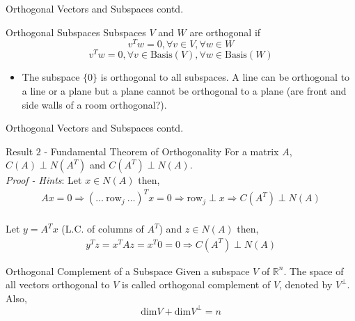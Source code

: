 \documentclass{beamer}
\begin{document}
\begin{frame}{Orthogonal Vectors and Subspaces contd.}
\begin{exampleblock}{Orthogonal Subspaces}
Subspaces $V$ and $W$ are orthogonal if 
\begin{equation*}
v^Tw = 0, \forall v \in V, \forall w \in W
\end{equation*}
\begin{equation*}
v^Tw = 0, \forall v \in \text{Basis}(V), \forall w \in \text{Basis}(W)
\end{equation*}
\end{exampleblock}
\begin{itemize}
    \item The subspace $\{0\}$ is orthogonal to all subspaces. A line can be orthogonal to a line or a plane but a plane cannot be orthogonal to a plane (are front and side walls of a room orthogonal?).
\end{itemize}
\end{frame}

\begin{frame}{Orthogonal Vectors and Subspaces contd.}
\begin{block}{Result $2$ - Fundamental Theorem of Orthogonality}
For a matrix $A$, $C(A) \perp N(A^T)$ and $C(A^T) \perp N(A)$.\\
\textit{Proof - Hints}: Let $x \in N(A)$ then,
\begin{align*}
    Ax = 0 \Rightarrow (\ldots \ \text{row}_j\ \ldots)^Tx = 0 \Rightarrow \text{row}_j \perp x \Rightarrow C(A^T) \perp N(A)
\end{align*}
\\
Let $y = A^Tx$ (L.C. of columns of $A^T$) and $z \in N(A)$ then,
\begin{align*}
    y^Tz = x^TAz = x^T0 = 0 \Rightarrow C(A^T) \perp N(A)
\end{align*}
\end{block}
\begin{exampleblock}{Orthogonal Complement of a Subspace}
Given a subspace $V$ of $\mathbb{R}^n$. The space of all vectors orthogonal to $V$ is called orthogonal complement of $V$, denoted by $V^{\perp}$. Also,
\begin{equation*}
    \text{dim}V + \text{dim}V^{\perp} = n
\end{equation*}
\end{exampleblock}
\end{frame}
\end{document}
